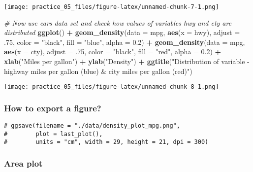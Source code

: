 \documentclass[
]{article}
\newenvironment{Shaded}{\begin{snugshade}}{\end{snugshade}}
\newcommand{\AttributeTok}[1]{\textcolor[rgb]{0.13,0.29,0.53}{#1}}
\newcommand{\CommentTok}[1]{\textcolor[rgb]{0.56,0.35,0.01}{\textit{#1}}}
\newcommand{\DecValTok}[1]{\textcolor[rgb]{0.00,0.00,0.81}{#1}}
\newcommand{\FloatTok}[1]{\textcolor[rgb]{0.00,0.00,0.81}{#1}}
\newcommand{\FunctionTok}[1]{\textcolor[rgb]{0.13,0.29,0.53}{\textbf{#1}}}
\newcommand{\NormalTok}[1]{#1}
\newcommand{\SpecialCharTok}[1]{\textcolor[rgb]{0.81,0.36,0.00}{\textbf{#1}}}
\newcommand{\StringTok}[1]{\textcolor[rgb]{0.31,0.60,0.02}{#1}}
\begin{document}
\texttt{[image: practice\_05\_files/figure-latex/unnamed-chunk-7-1.png]}

\begin{Shaded}
\begin{Highlighting}[]
\CommentTok{\#   Now use cars data set and check how values of variables hwy and cty are distributed}
\FunctionTok{ggplot}\NormalTok{() }\SpecialCharTok{+}
  \FunctionTok{geom\_density}\NormalTok{(}\AttributeTok{data =}\NormalTok{ mpg, }\FunctionTok{aes}\NormalTok{(}\AttributeTok{x =}\NormalTok{ hwy), }
               \AttributeTok{adjust =}\NormalTok{ .}\DecValTok{75}\NormalTok{,}
               \AttributeTok{color =} \StringTok{"black"}\NormalTok{, }\AttributeTok{fill =} \StringTok{"blue"}\NormalTok{, }
               \AttributeTok{alpha =} \FloatTok{0.2}\NormalTok{) }\SpecialCharTok{+}
  \FunctionTok{geom\_density}\NormalTok{(}\AttributeTok{data =}\NormalTok{ mpg, }\FunctionTok{aes}\NormalTok{(}\AttributeTok{x =}\NormalTok{ cty), }
               \AttributeTok{adjust =}\NormalTok{ .}\DecValTok{75}\NormalTok{,}
               \AttributeTok{color =} \StringTok{"black"}\NormalTok{, }\AttributeTok{fill =} \StringTok{"red"}\NormalTok{, }
               \AttributeTok{alpha =} \FloatTok{0.2}\NormalTok{) }\SpecialCharTok{+}
  \FunctionTok{xlab}\NormalTok{(}\StringTok{"Miles per gallon"}\NormalTok{) }\SpecialCharTok{+}
  \FunctionTok{ylab}\NormalTok{(}\StringTok{"Density"}\NormalTok{) }\SpecialCharTok{+}
  \FunctionTok{ggtitle}\NormalTok{(}\StringTok{"Distribution of variable {-} highway miles per gallon (blue) \& city miles per gallon (red)"}\NormalTok{)}
\end{Highlighting}
\end{Shaded}

\texttt{[image: practice\_05\_files/figure-latex/unnamed-chunk-8-1.png]}

\subsubsection{How to export a figure?}\label{how-to-export-a-figure}

\begin{verbatim}
# ggsave(filename = "./data/density_plot_mpg.png", 
#        plot = last_plot(),
#        units = "cm", width = 29, height = 21, dpi = 300)
\end{verbatim}

\subsubsection{Area plot}\label{area-plot}
\end{document}
